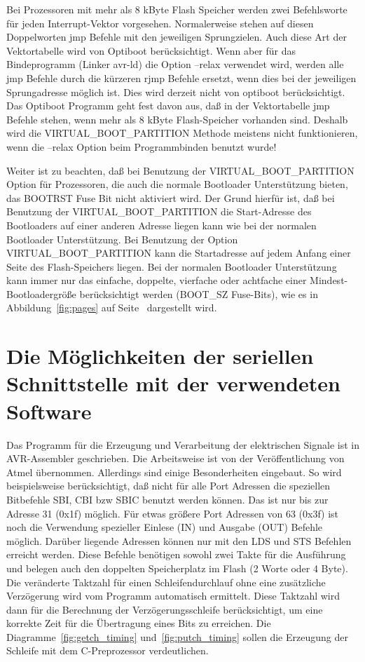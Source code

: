 Bei Prozessoren mit mehr als 8 kByte Flash Speicher werden zwei Befehlsworte für jeden Interrupt-Vektor
vorgesehen. Normalerweise stehen auf diesen Doppelworten jmp Befehle mit den jeweiligen Sprungzielen.
Auch diese Art der Vektortabelle wird von Optiboot berücksichtigt. Wenn aber für das Bindeprogramm
(Linker avr-ld) die Option --relax verwendet wird,
werden alle jmp Befehle durch die kürzeren rjmp Befehle ersetzt,
wenn dies bei der jeweiligen Sprungadresse möglich ist.
Dies wird derzeit nicht von optiboot berücksichtigt.
Das Optiboot Programm geht fest davon aus, daß in der Vektortabelle jmp Befehle stehen,
wenn mehr als 8 kByte Flash-Speicher vorhanden sind.
Deshalb wird die VIRTUAL\_BOOT\_PARTITION Methode meistens nicht funktionieren, wenn die --relax Option
beim Programmbinden benutzt wurde!


Weiter ist zu beachten, daß bei Benutzung der VIRTUAL\_BOOT\_PARTITION Option für Prozessoren, die auch
die normale Bootloader Unterstützung bieten, das BOOTRST Fuse Bit nicht aktiviert wird.
Der Grund hierfür ist, daß bei Benutzung der VIRTUAL\_BOOT\_PARTITION die Start-Adresse des Bootloaders
auf einer anderen Adresse liegen kann wie bei der normalen Bootloader Unterstützung.
Bei Benutzung der Option VIRTUAL\_BOOT\_PARTITION kann die Startadresse auf jedem Anfang einer
Seite des Flash-Speichers liegen. Bei der normalen Bootloader Unterstützung kann immer nur das
einfache, doppelte, vierfache oder achtfache einer Mindest-Bootloadergröße berücksichtigt
werden (BOOT\_SZ Fuse-Bits), wie es in Abbildung~\ref{fig:pages} auf Seite~\pageref{fig:pages}
dargestellt wird.

\section{Die Möglichkeiten der seriellen Schnittstelle mit der verwendeten Software}

Das Programm für die Erzeugung und Verarbeitung der elektrischen Signale ist in AVR-Assembler geschrieben.
Die Arbeitsweise ist von der Veröffentlichung von Atmel übernommen.
Allerdings sind einige Besonderheiten eingebaut. 
So wird beispielsweise berücksichtigt, daß nicht für alle Port Adressen die speziellen Bitbefehle SBI, CBI
bzw SBIC benutzt werden können. Das ist nur bis zur Adresse 31 (0x1f) möglich. Für etwas größere
Port Adressen von 63 (0x3f) ist noch die Verwendung spezieller Einlese (IN) und Ausgabe (OUT) Befehle
möglich. Darüber liegende Adressen können nur mit den LDS und STS Befehlen erreicht werden.
Diese Befehle benötigen sowohl zwei Takte für die Ausführung und belegen auch den doppelten
Speicherplatz im Flash (2 Worte oder 4 Byte).
Die veränderte Taktzahl für einen Schleifendurchlauf ohne eine zusätzliche Verzögerung wird 
vom Programm automatisch ermittelt.
Diese Taktzahl wird dann für die Berechnung der Verzögerungsschleife berücksichtigt,
um eine korrekte Zeit für die Übertragung eines Bits zu erreichen. 
Die Diagramme~\ref{fig:getch_timing} und~\ref{fig:putch_timing} sollen  die Erzeugung der Schleife mit
dem C-Preprozessor verdeutlichen.


